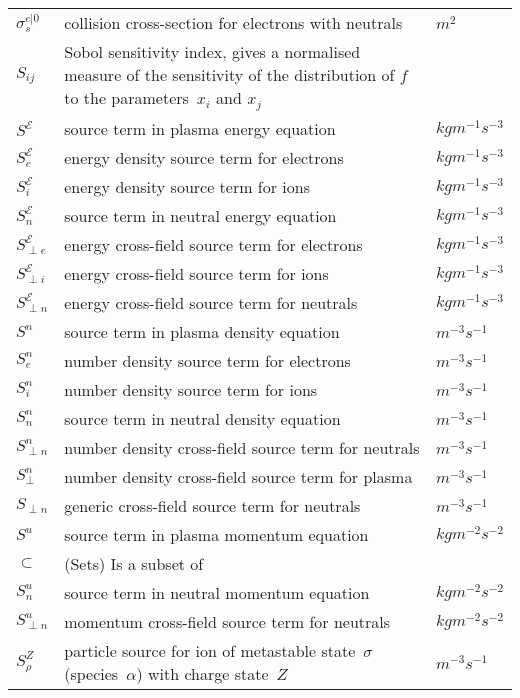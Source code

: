 \begin{longtable}{|p{3.0cm}|p{10.0cm}|p{3.0cm}|}
$\sigma_s^{e|0}$ & collision cross-section for electrons with neutrals  & $m^2$ \\
$S_{ij}$ & Sobol sensitivity index, gives a normalised measure of the sensitivity of the distribution of $f$ to the parameters~$x_i$ and $x_j$  & \\
$S^\mathcal{E}$ & source term in plasma energy equation  & $kg m^{-1} s^{-3}$ \\
$S^{\mathcal{E}}_{e}$ & energy density source term for electrons  & $kg m^{-1} s^{-3}$ \\
$S^{\mathcal{E}}_{i}$ & energy density source term for ions  & $kg m^{-1} s^{-3}$ \\
$S^\mathcal{E}_n$ & source term in neutral energy equation  & $kg m^{-1} s^{-3}$ \\
$S^\mathcal{E}_{\perp e}$ & energy cross-field source term for electrons  & $kg m^{-1} s^{-3}$ \\
$S^\mathcal{E}_{\perp i}$ & energy cross-field source term for ions   & $kg m^{-1} s^{-3}$ \\
$S^\mathcal{E}_{\perp n}$ & energy cross-field source term for neutrals  & $kg m^{-1} s^{-3}$ \\
$S^n$ & source term in plasma density equation  & $m^{-3} s^{-1}$ \\
$S^n_{e}$ & number density source term for electrons  & $m^{-3} s^{-1}$ \\
$S^n_{i}$ & number density source term for ions  & $m^{-3} s^{-1}$ \\
$S^n_n$ & source term in neutral density equation  & $m^{-3} s^{-1}$ \\
$S^n_{\perp n}$ & number density cross-field source term for neutrals  & $m^{-3} s^{-1}$ \\
$S^n_{\perp}$ & number density cross-field source term for plasma  & $m^{-3} s^{-1}$ \\
$S_{\perp n}$ & generic cross-field source term for neutrals  & $m^{-3} s^{-1}$ \\
$S^u$ & source term in plasma momentum equation  & $kg m^{-2} s^{-2}$ \\
$\subset$ &  (Sets) Is a subset of & \\
$S^u_n$ & source term in neutral momentum equation   & $kg m^{-2} s^{-2}$ \\
$S^u_{\perp n}$ & momentum cross-field source term for neutrals  & $kg m^{-2} s^{-2}$ \\
$S^Z_\rho$ & particle source for ion of metastable state~$\sigma$ (species~$\alpha$) with charge state~$Z$  & $m^{-3} s^{-1}$ \\

\end{longtable}
